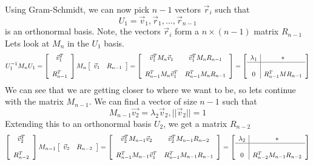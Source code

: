 \documentclass{article}
\begin{document}
Using Gram-Schmidt, we can now pick $n-1$ vectors $\vec{r}_i$ such that
$$U_1 = \vec{v}_1, \vec{r}_1, ..., \vec{r}_{n-1}$$ is an orthonormal basis. Note, the vectors $\vec{r}_i$ form a $n \times (n-1)$ matrix $R_{n-1}$
Lets look at $M_n$ in the $U_1$ basis.
\[
    U_1^{-1}M_nU_1=
    \left[
        \begin{array}{c}
            \vec{v}_1^T \\\\
            R_{n-1}^T
        \end{array}
    \right]
    M_n
    \left[
        \begin{array}{cc}
            \vec{v}_1 & R_{n-1}
        \end{array}
    \right] = 
    \left[
        \begin{array}{cc}
            \vec{v}_1^T M_n \vec{v}_1 & \vec{v}_1^T M_n R_{n-1} \\\\
            R_{n-1}^T M_n \vec{v}_1^T & R_{n-1}^T M_n R_{n-1}
        \end{array}
    \right] = 
    \left[
        \begin{array}{c|c}
            \lambda_1 & * \\
            \hline\\
            0 & R_{n-1}^T M R_{n-1}
        \end{array}
    \right]
\]
We can see that we are getting closer to where we want to be, so lets continue with the matrix $M_{n-1}$.
We can find a vector of size $n-1$ such that
$$M_{n-1}\vec{v_2}=\lambda_2\vec{v}_2, ||\vec{v}_2||=1$$
Extending this to an orthonormal basis $U_2$, we get a matrix $R_{n-2}$
\[
    \left[
        \begin{array}{c}
            \vec{v}_2^T \\\\
            R_{n-2}^T
        \end{array}
    \right]
    M_{n-1}
    \left[
        \begin{array}{cc}
            \vec{v}_2 & R_{n-2}
        \end{array}
    \right] = 
    \left[
        \begin{array}{cc}
            \vec{v}_2^T M_{n-1} \vec{v}_2 & \vec{v}_2^T M_{n-1} R_{n-2} \\\\
            R_{n-1}^T M_{n-1} \vec{v}_1^T & R_{n-1}^T M_{n-1} R_{n-1}
        \end{array}
    \right] = 
    \left[
        \begin{array}{c|c}
            \lambda_2 & * \\
            \hline\\
            0 & R_{n-2}^T M_{n-1} R_{n-2}
        \end{array}
    \right]
\]
\end{document}

